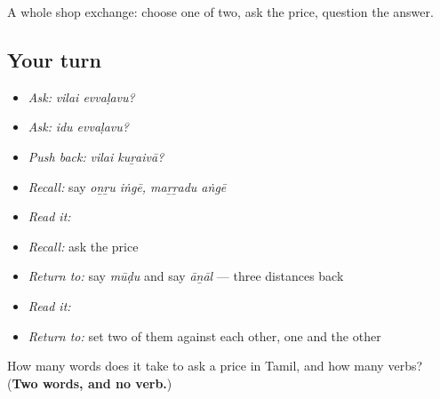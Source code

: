 \begin{grammarlens}[title={What you've built}]
A whole shop exchange: choose one of two, ask the price, question the answer.
\end{grammarlens}

\subsection*{Your turn}
\begin{itemize}
\raggedright
  \item \emph{Ask:} \emph{vilai evvaḷavu?}
  \item \emph{Ask:} \emph{idu evvaḷavu?}
  \item \emph{Push back:} \emph{vilai kuṟaivā?}
  \item \emph{Recall:} say \emph{oṉṟu iṅgē, maṟṟadu aṅgē}
  \item \emph{Read it:} \textbf{}
  \item \emph{Recall:} ask the price
  \item \emph{Return to:} say \emph{mūḍu} and say \emph{āṉāl} — three distances back
  \item \emph{Read it:} \textbf{}
  \item \emph{Return to:} set two of them against each other, one and the other
\end{itemize}

\begin{tcolorbox}[breakable,colback=teal!4,colframe=teal!35!black,title={Before you move on}]
How many words does it take to ask a price in Tamil, and how many verbs? (\textbf{Two words, and no verb.})
\end{tcolorbox}
